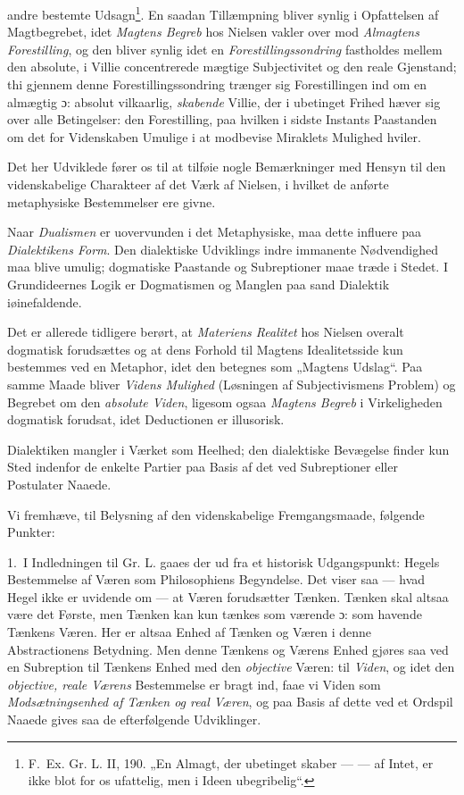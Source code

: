 \documentclass[12pt,a4paper]{book}
\newcommand{\opage}[1]{\marginnote{\footnotesize\textit{[#1]}}}
\begin{document}
andre bestemte Udsagn\footnote{F.\ Ex. Gr. L. II, 190. „En Almagt, der ubetinget skaber ---
--- af Intet, er ikke blot for os ufattelig, men i Ideen ubegribelig“.}. En saadan
Tillæmpning bliver synlig i Opfattelsen af Magtbegrebet, idet \emph{Magtens Begreb} hos
Nielsen vakler over mod \emph{Almagtens Forestilling}, og den bliver synlig idet en
\emph{Forestillingssondring} fastholdes mellem den absolute, i Villie concentrerede mægtige
Subjectivitet og den reale Gjenstand; thi gjennem denne Forestillingssondring trænger sig
Forestillingen ind om en almægtig ɔ: absolut vilkaarlig, \emph{skabende} Villie, der i ubetinget
Frihed hæver sig over alle Betingelser: den Forestilling, paa hvilken i sidste Instants
Paastanden om det for Videnskaben Umulige i at modbevise Miraklets Mulighed hviler.

\opage{176}Det her Udviklede fører os til at tilføie nogle Bemærkninger med Hensyn til den
videnskabelige Charakteer af det Værk af Nielsen, i hvilket de anførte metaphysiske
Bestemmelser ere givne.

Naar \emph{Dualismen} er uovervunden i det Metaphysiske, maa dette influere paa
\emph{Dialektikens Form}. Den dialektiske Udviklings indre immanente Nødvendighed maa blive
umulig; dogmatiske Paastande og Subreptioner maae træde i Stedet. I Grundideernes Logik er
Dogmatismen og Manglen paa sand Dialektik iøinefaldende.

Det er allerede tidligere berørt, at \emph{Materiens Realitet} hos Nielsen overalt dogmatisk
forudsættes og at dens Forhold til Magtens Idealitetsside kun bestemmes ved en Metaphor, idet
den betegnes som „Magtens Udslag“. Paa samme Maade bliver \emph{Videns Mulighed} (Løsningen
af Subjectivismens Problem) og Begrebet om den \emph{absolute Viden}, ligesom ogsaa
\emph{Magtens Begreb} i Virkeligheden dogmatisk forudsat, idet Deductionen er illusorisk.

Dialektiken mangler i Værket som Heelhed; den dialektiske Bevægelse finder kun Sted indenfor
de enkelte Partier paa Basis af det ved Subreptioner eller Postulater Naaede.

Vi fremhæve, til Belysning af den videnskabelige Fremgangsmaade, følgende Punkter:

1.~I Indledningen til Gr. L. gaaes der ud fra et historisk Udgangspunkt: Hegels Bestemmelse
af Væren som Philosophiens Begyndelse. Det viser saa --- hvad Hegel ikke er uvidende om ---
at Væren forudsætter Tænken. Tænken skal altsaa være det Første, men Tænken kan kun tænkes
som værende ɔ: som havende Tænkens Væren. Her er altsaa Enhed af Tænken og Væren i denne
Abstractionens Betydning. Men denne Tænkens og Værens Enhed gjøres saa ved en Subreption til
Tænkens Enhed med den \emph{objective} Væren: til \emph{Viden}, og idet den \emph{objective, reale Værens} Bestemmelse er bragt ind, faae vi Viden som \emph{Modsætningsenhed af Tænken og real
Væren}, og paa Basis af dette ved et Ordspil Naaede gives saa de efterfølgende Udviklinger.
\end{document}
